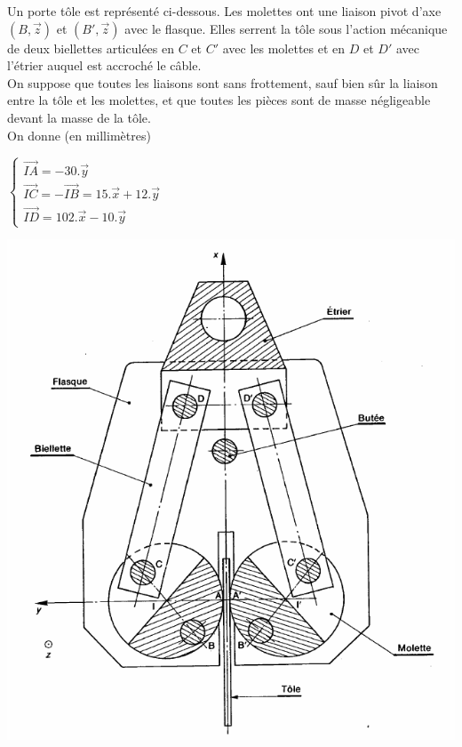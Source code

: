 

Un porte tôle est représenté ci-dessous. Les molettes ont une liaison pivot d'axe $(B,\overrightarrow{z})$ et $(B',\overrightarrow{z})$ avec le flasque. Elles serrent la tôle sous l'action mécanique de deux biellettes articulées en $C$ et $C'$ avec les molettes et en $D$ et $D'$ avec l'étrier auquel est accroché le câble.\\
On suppose que toutes les liaisons sont sans frottement, sauf bien sûr la liaison entre la tôle et les molettes, et que toutes les pièces sont de masse négligeable devant la masse de la tôle.\\
On donne (en millimètres)
\begin{center}
$\left\{
\begin{array}{rcl}
	\overrightarrow{IA}=-30.\overrightarrow{y}\\
	\overrightarrow{IC}=-\overrightarrow{IB}=15.\overrightarrow{x}+12.\overrightarrow{y}\\
	\overrightarrow{ID}=102.\overrightarrow{x}-10.\overrightarrow{y}
\end{array}\right.$
\end{center}

\begin{center}
\includegraphics[scale=0.5]{png/molettes.png}
\end{center}

